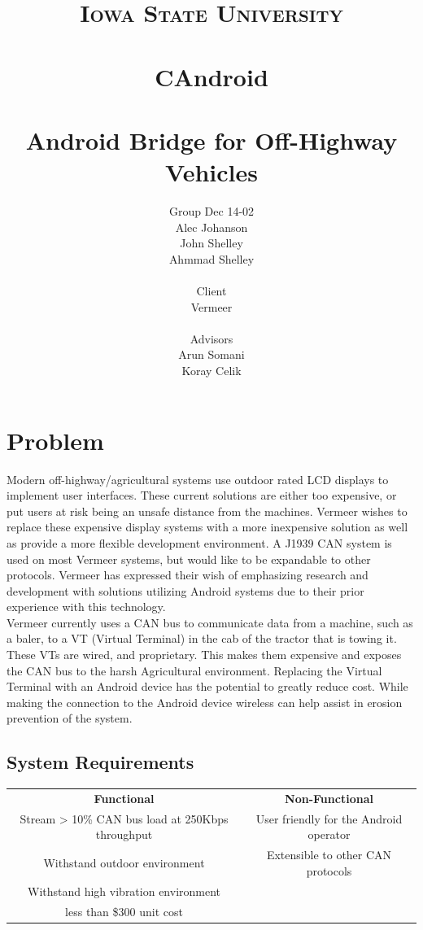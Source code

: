 \documentclass[paper=a4, fontsize=11pt]{scrartcl}
\title{
		\vspace{1in} 	
		\usefont{OT1}{bch}{b}{n}
		\normalfont \normalsize \textsc{Iowa State University} \\ [25pt]
		{\color{darkgreen}\horrule{1pt} \\[0.5cm]}
		\huge CAndroid \\
		{\color{darkgreen}\horrule{1pt} \\[0.5cm]}
		\large Android Bridge for Off-Highway Vehicles
		\vspace{1.25in}
}
\author{
		\normalfont 								\normalsize
		{\color{darkgreen} Group Dec 14-02}\\ \normalsize
        Alec Johanson\\[-3pt]		\normalsize
        John Shelley\\[-3pt]		\normalsize
        Ahmmad Shelley\\[-3pt]		\normalsize
		\\ \normalsize
		{\color{darkgreen} Client}\\ \normalsize
		Vermeer \\ \normalsize
		\\ \normalsize
		{\color{darkgreen} Advisors}\\ \normalsize
		Arun Somani \\ \normalsize
		Koray Celik \\ \normalsize
}
\date{}
\numberwithin{equation}{section}		%
\numberwithin{figure}{section}			%
\numberwithin{table}{section}				%
\begin{document}
\maketitle
\pagebreak
\tableofcontents
\pagebreak
\section{Problem}
Modern off-highway/agricultural systems use outdoor rated LCD displays to implement user interfaces. These current solutions are either too expensive, or put users at risk being an unsafe distance from the machines. Vermeer wishes to replace these expensive display systems with a more inexpensive solution as well as provide a more flexible development environment. A J1939 CAN system is used on most Vermeer systems, but would like to be expandable to other protocols. Vermeer has expressed their wish of emphasizing research and development with solutions utilizing Android systems due to their prior experience with this technology. \\

Vermeer currently uses a CAN bus to communicate data from a machine, such as a baler, to a VT (Virtual Terminal) in the cab of the tractor that is towing it. These VTs are wired, and proprietary. This makes them expensive and exposes the CAN bus to the harsh Agricultural environment. Replacing the Virtual Terminal with an Android device has the potential to greatly reduce cost. While making the connection to the Android device wireless can help assist in erosion prevention of the system. \\

\subsection{System Requirements}
\vspace{10pt}
\begin{tabular}{c | c}
	\textbf{Functional} & \textbf{Non-Functional} \\ [2ex]
	Stream > 10\%  CAN bus load at 250Kbps throughput & User friendly for the Android operator \\ [1ex]
	Withstand outdoor environment & Extensible to other CAN protocols \\ [1ex]
	Withstand high vibration environment & \\ [1ex]
	less than \$300 unit cost & \\ [1ex]
\end{tabular}
\end{document}
